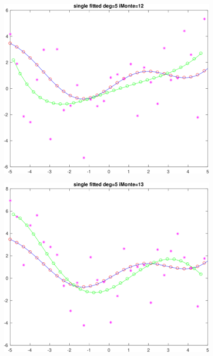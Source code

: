 \begin{figure}[h!]
\centering\includegraphics[scale=0.1]{single_poly_d_5_iMonte_12.png}
\end{figure}



\begin{figure}[h!]
\centering\includegraphics[scale=0.1]{single_poly_d_5_iMonte_13.png}
\end{figure}


